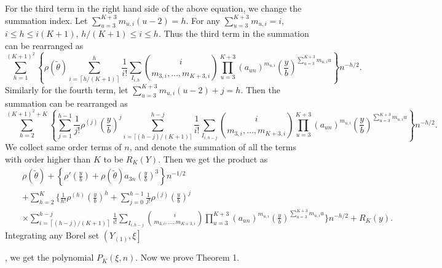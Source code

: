 \documentclass[oneside,english]{amsbook}
\numberwithin{section}{chapter}
\numberwithin{equation}{section}
\numberwithin{figure}{section}
\theoremstyle{plain}
\theoremstyle{plain}
\theoremstyle{definition}
\theoremstyle{plain}
\theoremstyle{plain}
\theoremstyle{remark}
\theoremstyle{definition}
\theoremstyle{definition}
\begin{document}
For the third term in the right hand side of the above equation, we
change the summation index. Let $\sum_{u=3}^{K+3}m_{u,i}\left(u-2\right)=h$.
For any $\sum_{u=3}^{K+3}m_{u,i}=i$, $i\le h\le i\left(K+1\right)$,
$h/\left(K+1\right)\le i\le h$. Thus the third term in the summation can
be rearranged as 
\[
\sum_{h=1}^{\left(K+1\right)^{2}}\left\{ \rho\left(\tilde{\theta}\right)\sum_{i=\left\lceil h/\left(K+1\right)\right\rceil }^{h}\frac{1}{i!}\sum_{I_{i,h}}\binom{i}{m_{3,i},\ldots,m_{K+3,i}}\prod_{u=3}^{K+3}\left(a_{un}\right)^{m_{u,i}}\left(\frac{y}{b}\right)^{\sum_{u=3}^{K+3}m_{u,i}u}\right\} n^{-h/2}.
\]
Similarly for the fourth term, let $\sum_{u=3}^{K+3}m_{u,i}\left(u-2\right)+j=h$.
Then the summation can be rearranged as 
\[
\sum_{h=2}^{\left(K+1\right)^{2}+K}\left\{ \sum_{j=1}^{h-1}\frac{1}{j!}\rho^{\left(j\right)}\left(\frac{y}{b}\right)^{j}\sum_{i=\lceil \left(h-j\right)/\left(K+1\right) \rceil}^{h-j}\frac{1}{i!}\sum_{I_{i,h-j}}\binom{i}{m_{3,i},\ldots,m_{K+3,i}}\prod_{u=3}^{K+3}\left(a_{un}\right)^{m_{u,i}}\left(\frac{y}{b}\right)^{\sum_{u=3}^{K+3}m_{u,i}u}\right\} n^{-h/2}.
\]
We collect  same order terms of $n$, and denote the summation of
all the terms with order higher than $K$ to be $R_{K}\left(Y\right)$.
Then we get the product as 
\begin{eqnarray*}
 &  & \rho\left(\tilde{\theta}\right)+\left\{ \rho'\left(\frac{y}{b}\right)+\rho\left(\tilde{\theta}\right)a_{3n}\left(\frac{y}{b}\right)^{3}\right\} n^{-1/2}\\
 &  & +\sum_{h=2}^{K}\Bigg\{ \frac{1}{h!}\rho^{\left(h\right)}\left(\frac{y}{b}\right)^{h}+\sum_{j=0}^{h-1}\frac{1}{j!}\rho^{\left(j\right)}\left(\frac{y}{b}\right)^{j}\\
 &&\times\sum_{i=\left\lceil \left(h-j\right)/\left(K+1\right)\right\rceil }^{h-j}\frac{1}{i!}\sum_{I_{i,h-j}}\binom{i}{m_{3,i},\ldots,m_{K+3,i}}\prod_{u=3}^{K+3}\left(a_{un}\right)^{m_{u,i}}\left(\frac{y}{b}\right)^{\sum_{u=3}^{K+3}m_{u,i}u}\Bigg\} n^{-h/2}+R_{K}\left(y\right).
\end{eqnarray*}
 Integrating any Borel set $\left(Y_{\left(1\right)},\xi\right]$%

, we get the polynomial $P_{K}\left(\xi,n\right)$. Now we prove Theorem
1.%
\end{document}
